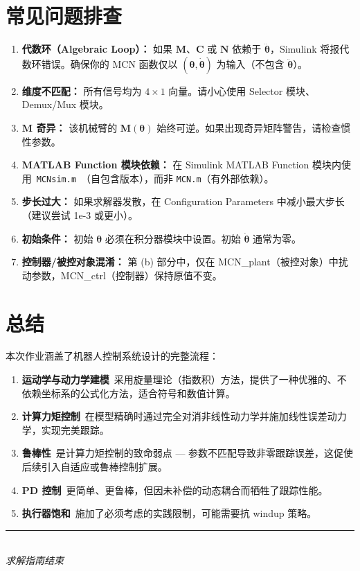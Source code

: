 \documentclass[12pt,a4paper]{ctexart}
\begin{document}
\section{常见问题排查}

\begin{warningbox}[常见陷阱]
\begin{enumerate}[leftmargin=*]
  \item \textbf{代数环（Algebraic Loop）：} 如果 $\mathbf{M}$、$\mathbf{C}$ 或 $\mathbf{N}$ 依赖于 $\ddot{\bm{\theta}}$，Simulink 将报代数环错误。确保你的 MCN 函数仅以 $(\bm{\theta},\dot{\bm{\theta}})$ 为输入（不包含 $\ddot{\bm{\theta}}$）。
  \item \textbf{维度不匹配：} 所有信号均为 $4\times 1$ 向量。请小心使用 Selector 模块、Demux/Mux 模块。
  \item \textbf{$\mathbf{M}$ 奇异：} 该机械臂的 $\mathbf{M}(\bm{\theta})$ 始终可逆。如果出现奇异矩阵警告，请检查惯性参数。
  \item \textbf{MATLAB Function 模块依赖：} 在 Simulink MATLAB Function 模块内使用\ \texttt{MCNsim.m}\ （自包含版本），而非 \texttt{MCN.m}（有外部依赖）。
  \item \textbf{步长过大：} 如果求解器发散，在 Configuration Parameters 中减小最大步长（建议尝试 1e-3 或更小）。
  \item \textbf{初始条件：} 初始 $\bm{\theta}$ 必须在积分器模块中设置。初始 $\dot{\bm{\theta}}$ 通常为零。
  \item \textbf{控制器/被控对象混淆：} 第 (b) 部分中，仅在 MCN\_plant（被控对象）中扰动参数，MCN\_ctrl（控制器）保持原值不变。
\end{enumerate}
\end{warningbox}

\section{总结}

本次作业涵盖了机器人控制系统设计的完整流程：

\begin{enumerate}[leftmargin=*]
  \item \textbf{运动学与动力学建模}\ 采用旋量理论（指数积）方法，提供了一种优雅的、不依赖坐标系的公式化方法，适合符号和数值计算。
  \item \textbf{计算力矩控制}\ 在模型精确时通过完全对消非线性动力学并施加线性误差动力学，实现完美跟踪。
  \item \textbf{鲁棒性}\ 是计算力矩控制的致命弱点 --- 参数不匹配导致非零跟踪误差，这促使后续引入自适应或鲁棒控制扩展。
  \item \textbf{PD 控制}\ 更简单、更鲁棒，但因未补偿的动态耦合而牺牲了跟踪性能。
  \item \textbf{执行器饱和}\ 施加了必须考虑的实践限制，可能需要抗 windup 策略。
\end{enumerate}

\vspace{1cm}
\begin{center}
\rule{0.5\textwidth}{0.5pt}\\[5pt]
\textit{求解指南结束}
\end{center}
\end{document}
